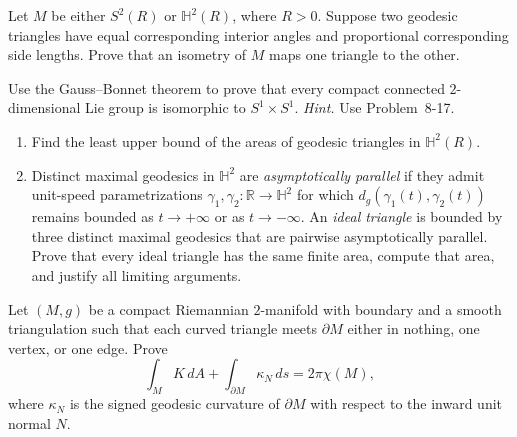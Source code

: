 \begin{exercise}
\label{prob:similar-triangles-congruent}

Let $M$ be either $S^2(R)$ or $\mathbb H^2(R)$, where $R>0$. Suppose two
geodesic triangles have equal corresponding interior angles and proportional
corresponding side lengths. Prove that an isometry of $M$ maps one triangle
to the other.
\end{exercise}

\begin{exercise}
\label{prob:compact-lie-groups-isomorphic}

Use the Gauss--Bonnet theorem to prove that every compact connected
$2$-dimensional Lie group is isomorphic to $S^1\times S^1$.
\emph{Hint.} Use Problem~8-17.
\end{exercise}

\begin{exercise}
\label{prob:ideal-triangles-hyperbolic}

\begin{enumerate}
\item[(a)] Find the least upper bound of the areas of geodesic triangles in
$\mathbb H^2(R)$.
\item[(b)] Distinct maximal geodesics in $\mathbb H^2$ are
\emph{asymptotically parallel} if they admit unit-speed parametrizations
$\gamma_1,\gamma_2:\mathbb R\to\mathbb H^2$ for which
$d_g(\gamma_1(t),\gamma_2(t))$ remains bounded as $t\to+\infty$ or as
$t\to-\infty$. An \emph{ideal triangle} is bounded by three distinct maximal
geodesics that are pairwise asymptotically parallel. Prove that every ideal
triangle has the same finite area, compute that area, and justify all limiting
arguments.
\end{enumerate}
\end{exercise}

\begin{exercise}
\label{prob:gauss-bonnet-with-boundary}

Let $(M,g)$ be a compact Riemannian $2$-manifold with boundary and a smooth
triangulation such that each curved triangle meets $\partial M$ either in
nothing, one vertex, or one edge. Prove
\[
\int_MK\,dA+\int_{\partial M}\kappa_N\,ds=2\pi\chi(M),
\]
where $\kappa_N$ is the signed geodesic curvature of $\partial M$ with
respect to the inward unit normal $N$.
\end{exercise}

